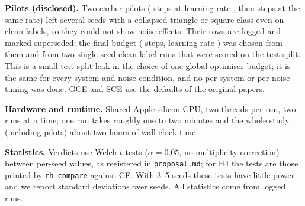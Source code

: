 \textbf{Pilots (disclosed).} Two earlier pilots ( steps at learning rate , then  steps at the same rate) left several seeds with a collapsed triangle or square class even on clean labels, so they could not show noise effects. Their rows are logged and marked superseded; the final budget ( steps, learning rate ) was chosen from them and from two single-seed clean-label runs that were scored on the test split. This is a small test-split leak in the choice of one global optimiser budget; it is the same for every system and noise condition, and no per-system or per-noise tuning was done. GCE and SCE use the defaults of the original papers.

\textbf{Hardware and runtime.} Shared Apple-silicon CPU, two threads per run, two runs at a time; one run takes roughly one to two minutes and the whole study (including pilots) about two hours of wall-clock time.

\textbf{Statistics.} Verdicts use Welch $t$-tests ($\alpha=0.05$, no multiplicity correction) between per-seed values, as registered in \texttt{proposal.md}; for H4 the tests are those printed by \texttt{rh compare} against CE. With 3--5 seeds these tests have little power and we report standard deviations over seeds. All statistics come from logged runs.
